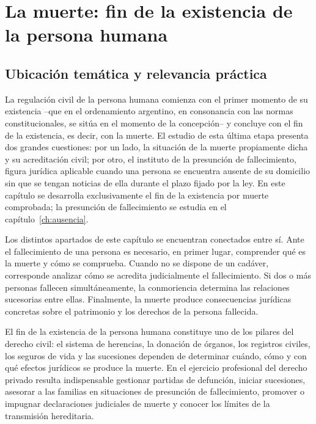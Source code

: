 \documentclass[12pt,oneside]{book}
\begin{document}
\chapter{La muerte: fin de la existencia de la persona humana}
\label{ch:muerte}

\section{Ubicación temática y relevancia práctica}
La regulación civil de la persona humana comienza con el primer momento de su existencia --que en el ordenamiento argentino, en consonancia con las normas constitucionales, se sitúa en el momento de la concepción-- y concluye con el fin de la existencia, es decir, con la muerte. El estudio de esta última etapa presenta dos grandes cuestiones: por un lado, la situación de la muerte propiamente dicha y su acreditación civil; por otro, el instituto de la presunción de fallecimiento, figura jurídica aplicable cuando una persona se encuentra ausente de su domicilio sin que se tengan noticias de ella durante el plazo fijado por la ley. En este capítulo se desarrolla exclusivamente el fin de la existencia por muerte comprobada; la presunción de fallecimiento se estudia en el capítulo~\ref{ch:ausencia}.

\begin{note}
Los distintos apartados de este capítulo se encuentran conectados entre sí. Ante el fallecimiento de una persona es necesario, en primer lugar, comprender qué es la muerte y cómo se comprueba. Cuando no se dispone de un cadáver, corresponde analizar cómo se acredita judicialmente el fallecimiento. Si dos o más personas fallecen simultáneamente, la conmoriencia determina las relaciones sucesorias entre ellas. Finalmente, la muerte produce consecuencias jurídicas concretas sobre el patrimonio y los derechos de la persona fallecida.
\end{note}

El fin de la existencia de la persona humana constituye uno de los pilares del derecho civil: el sistema de herencias, la donación de órganos, los registros civiles, los seguros de vida y las sucesiones dependen de determinar cuándo, cómo y con qué efectos jurídicos se produce la muerte. En el ejercicio profesional del derecho privado resulta indispensable gestionar partidas de defunción, iniciar sucesiones, asesorar a las familias en situaciones de presunción de fallecimiento, promover o impugnar declaraciones judiciales de muerte y conocer los límites de la transmisión hereditaria.
\end{document}
